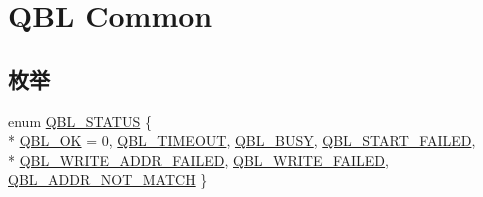 \hypertarget{group__qbl}{}\section{Q\+BL Common}
\label{group__qbl}
\subsection*{枚举}
\begin{DoxyCompactItemize}
\item 
enum \hyperlink{group__qbl_ga41526b685f55486191108499fe91c30b}{Q\+B\+L\+\_\+\+S\+T\+A\+T\+US} \{ \\*
\hyperlink{group__qbl_gga41526b685f55486191108499fe91c30bac339d014a999e1d614721110672e1ad9}{Q\+B\+L\+\_\+\+OK} = 0, 
\hyperlink{group__qbl_gga41526b685f55486191108499fe91c30ba654a5a717eb326de65c78984d2fcedb8}{Q\+B\+L\+\_\+\+T\+I\+M\+E\+O\+UT}, 
\hyperlink{group__qbl_gga41526b685f55486191108499fe91c30ba3295fefcc0c943fce64ad4d72be4edec}{Q\+B\+L\+\_\+\+B\+U\+SY}, 
\hyperlink{group__qbl_gga41526b685f55486191108499fe91c30baa1394dd50bddb4d957f937385c5f93a2}{Q\+B\+L\+\_\+\+S\+T\+A\+R\+T\+\_\+\+F\+A\+I\+L\+ED}, 
\\*
\hyperlink{group__qbl_gga41526b685f55486191108499fe91c30baee9299722a126dba22c76d3d9e5971e3}{Q\+B\+L\+\_\+\+W\+R\+I\+T\+E\+\_\+\+A\+D\+D\+R\+\_\+\+F\+A\+I\+L\+ED}, 
\hyperlink{group__qbl_gga41526b685f55486191108499fe91c30ba1be03d0c1d667116cb382a49df76e223}{Q\+B\+L\+\_\+\+W\+R\+I\+T\+E\+\_\+\+F\+A\+I\+L\+ED}, 
\hyperlink{group__qbl_gga41526b685f55486191108499fe91c30ba168ae4cc03a406e4ea624f38fecedbc9}{Q\+B\+L\+\_\+\+A\+D\+D\+R\+\_\+\+N\+O\+T\+\_\+\+M\+A\+T\+CH}
 \}
\end{DoxyCompactItemize}
